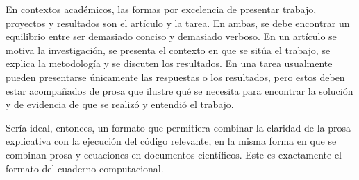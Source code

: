 En contextos académicos, las formas por excelencia de presentar trabajo,
proyectos y resultados son el artículo y la tarea. En ambas, se debe encontrar un
equilibrio entre ser demasiado conciso y demasiado verboso.
En un artículo se motiva la investigación, se presenta el contexto en que se sitúa el
trabajo, se explica la metodología y se discuten los resultados.
En una tarea usualmente pueden presentarse únicamente las respuestas o los resultados,
pero estos deben estar acompañados de prosa que ilustre qué se necesita para encontrar
la solución y de evidencia de que se realizó y entendió el trabajo.

Sería ideal, entonces, un formato que permitiera combinar la claridad de la prosa
explicativa con la ejecución del código relevante, en la misma forma en que se combinan
prosa y ecuaciones en documentos científicos. Este es exactamente el formato del
cuaderno computacional.




